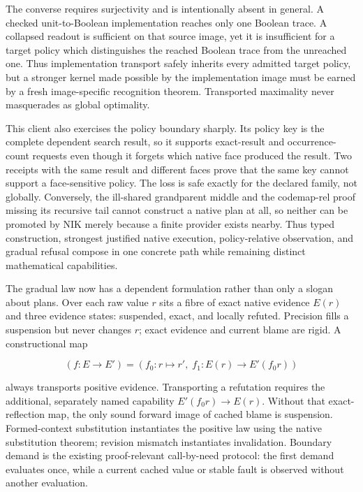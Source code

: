 \documentclass[11pt]{article}
\begin{document}
The converse requires surjectivity and is intentionally absent in general.
A checked unit-to-Boolean implementation reaches only one Boolean trace.  A
collapsed readout is sufficient on that source image, yet it is insufficient
for a target policy which distinguishes the reached Boolean trace from the
unreached one.  Thus implementation transport safely inherits every admitted
target policy, but a stronger kernel made possible by the implementation image
must be earned by a fresh image-specific recognition theorem.  Transported
maximality never masquerades as global optimality.

This client also exercises the policy boundary sharply.  Its policy key is the
complete dependent search result, so it supports exact-result and
occurrence-count requests even though it forgets which native face produced
the result.  Two receipts with the same result and different faces prove that
the same key cannot support a face-sensitive policy.  The loss is safe exactly
for the declared family, not globally.  Conversely, the ill-shared grandparent
middle and the code{map-rel} proof missing its recursive tail cannot construct
a native plan at all, so neither can be promoted by NIK merely because a finite
provider exists nearby.  Thus typed construction, strongest justified native
execution, policy-relative observation, and gradual refusal compose in one
concrete path while remaining distinct mathematical capabilities.

The gradual law now has a dependent formulation rather than only a slogan about
plans.  Over each raw value $r$ sits a fibre of exact native evidence $E(r)$ and
three evidence states: suspended, exact, and locally refuted.  Precision fills a
suspension but never changes $r$; exact evidence and current blame are rigid.
A constructional map

\[
  (f:E\to E')=(f_0:r\mapsto r',\;
               f_1:E(r)\to E'(f_0r))
\]

always transports positive evidence.  Transporting a refutation requires the
additional, separately named capability
$E'(f_0r)\to E(r)$.  Without that exact-reflection map, the only sound forward
image of cached blame is suspension.  Formed-context substitution instantiates
the positive law using the native substitution theorem; revision mismatch
instantiates invalidation.  Boundary demand is the existing proof-relevant
call-by-need protocol: the first demand evaluates once, while a current cached
value or stable fault is observed without another evaluation.
\end{document}
